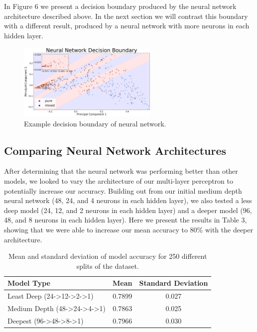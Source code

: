 \documentclass[12pt]{article}
\begin{document}
In Figure 6 we present a decision boundary produced by the neural network architecture described above. In the next section we will contrast this boundary with a different result, produced by a neural network with more neurons in each hidden layer. 

\begin{figure}[H]
\centering
\includegraphics[width=0.6\textwidth]{initialboundary}
\caption{Example decision boundary of neural network.}
\end{figure}

\subsection{Comparing Neural Network Architectures}

After determining that the neural network was performing better than other models, we looked to vary the architecture of our multi-layer perceptron to potentially increase our accuracy. Building out from our initial medium depth neural network (48, 24, and 4 neurons in each hidden layer), we also tested a less deep model (24, 12, and 2 neurons in each hidden layer) and a deeper model (96, 48, and 8 neurons in each hidden layer). Here we present the results in Table 3, showing that we were able to increase our mean accuracy to 80\% with the deeper architecture. 

\begin{table}[H]
\centering
\begin{tabular}{|l|c|c|}
\hline
\multicolumn{1}{|l|}{Model Type} & Mean & \multicolumn{1}{l|}{Standard Deviation} \\ \hline
Least Deep (24-\textgreater{}12-\textgreater{}2-\textgreater{}1) & 0.7899 & 0.027 \\
\hline
Medium Depth (48-\textgreater{}24-\textgreater{}4-\textgreater{}1) & 0.7863 & 0.025 \\
\hline
Deepest (96-\textgreater{}48-\textgreater{}8-\textgreater{}1) & 0.7966 & 0.030 \\
\hline
\end{tabular}
\caption{Mean and standard deviation of model accuracy for 250 different splits of the dataset.}
\end{table}
\end{document}
